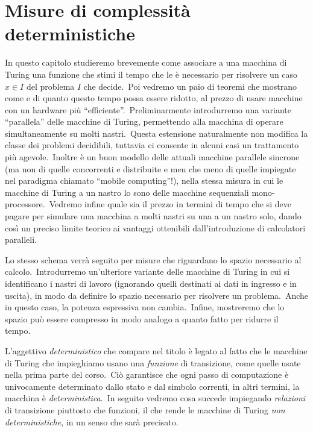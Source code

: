 \section{Misure di complessità deterministiche}

In questo capitolo studieremo brevemente come associare a una macchina di Turing una funzione che stimi il tempo che le è necessario per risolvere un caso $x \in I$ del problema $I$ che decide.\
Poi vedremo un paio di teoremi che mostrano come e di quanto questo tempo possa essere ridotto, al prezzo di usare macchine con un hardware più ``efficiente''.\
Preliminarmente introdurremo una variante ``parallela'' delle macchine di Turing, permettendo alla macchina di operare simultaneamente su molti nastri.\
Questa estensione naturalmente non modifica la classe dei problemi decidibili, tuttavia ci consente in alcuni casi un trattamento più agevole.\
Inoltre è un buon modello delle attuali macchine parallele sincrone (ma non di quelle concorrenti e distribuite e men che meno di quelle impiegate nel paradigma chiamato ``mobile computing''!), nella stessa misura in cui le macchine di Turing a un nastro lo sono delle macchine sequenziali mono-processore.\
Vedremo infine quale sia il prezzo in termini di tempo che si deve pagare per simulare una macchina a molti nastri su una a un nastro solo, dando così un preciso limite teorico ai vantaggi ottenibili dall'introduzione di calcolatori paralleli.\

Lo stesso schema verrà seguito per misure che riguardano lo spazio necessario al calcolo.\
Introdurremo un'ulteriore variante delle macchine di Turing in cui si identificano i nastri di lavoro (ignorando quelli destinati ai dati in ingresso e in uscita), in modo da definire lo spazio necessario per risolvere un problema.\
Anche in questo caso, la potenza espressiva non cambia.\
Infine, mostreremo che lo spazio può essere compresso in modo analogo a quanto fatto per ridurre il tempo.\

L'aggettivo \textit{deterministico} che compare nel titolo è legato al fatto che le macchine di Turing che impieghiamo usano una \textit{funzione} di transizione, come quelle usate nella prima parte del corso.\
Ciò garantisce che ogni passo di computazione è univocamente determinato dallo stato e dal simbolo correnti, in altri termini, la macchina è \textit{deterministica}.\
In seguito vedremo cosa succede impiegando \textit{relazioni} di transizione piuttosto che funzioni, il che rende le macchine di Turing \textit{non deterministiche}, in un senso che sarà precisato.\

